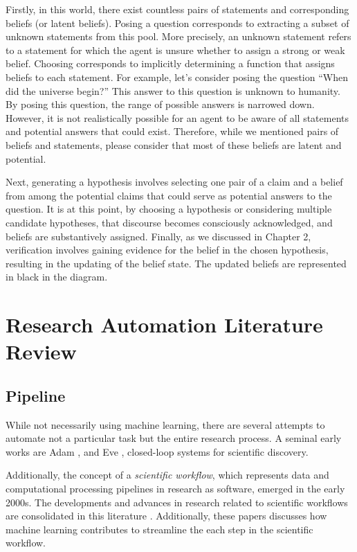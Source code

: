 \documentclass{book}
\begin{document}
Firstly, in this world, there exist countless pairs of statements and corresponding beliefs (or latent beliefs). Posing a question corresponds to extracting a subset of unknown statements from this pool. More precisely, an unknown statement refers to a statement for which the agent is unsure whether to assign a strong or weak belief. Choosing corresponds to implicitly determining a function that assigns beliefs to each statement. For example, let's consider posing the question ``When did the universe begin?'' This answer to this question is unknown to humanity. By posing this question, the range of possible answers is narrowed down. However, it is not realistically possible for an agent to be aware of all statements and potential answers that could exist. Therefore, while we mentioned pairs of beliefs and statements, please consider that most of these beliefs are latent and potential.

Next, generating a hypothesis involves selecting one pair of a claim and a belief from among the potential claims that could serve as potential answers to the question. It is at this point, by choosing a hypothesis or considering multiple candidate hypotheses, that discourse becomes consciously acknowledged, and beliefs are substantively assigned. Finally, as we discussed in Chapter 2, verification involves gaining evidence for the belief in the chosen hypothesis, resulting in the updating of the belief state. The updated beliefs are represented in black in the diagram.

\chapter{Research Automation Literature Review}

\section{Pipeline}
While not necessarily using machine learning, there are several attempts to automate not a particular task but the entire research process. A seminal early works are Adam \cite{king2004functional}, and Eve \cite{williams2015cheaper}, closed-loop systems for scientific discovery. 

Additionally, the concept of a \textit{scientific workflow}, which represents data and computational processing pipelines in research as software, emerged in the early 2000s. The developments and advances in research related to scientific workflows are consolidated in this literature \cite{barker2008scientific,atkinson2017scientific}. Additionally, these papers \cite{deelman2019role,nouri2021exploring} discusses how machine learning contributes to streamline the each step in the scientific workflow.
\end{document}
